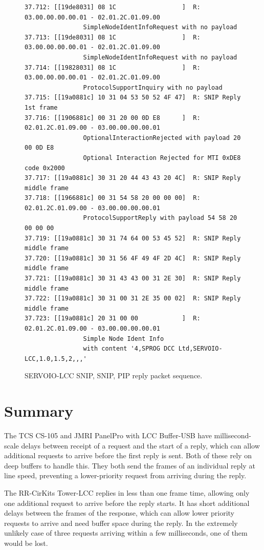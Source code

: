 \documentclass[11pt]{article}
\begin{document}
\cbstart
\begin{figure}[!htbp]
\begin{verbatim}
37.712: [[19de8031] 08 1C                  ]  R: 03.00.00.00.00.01 - 02.01.2C.01.09.00 
                SimpleNodeIdentInfoRequest with no payload
37.713: [[19de8031] 08 1C                  ]  R: 03.00.00.00.00.01 - 02.01.2C.01.09.00 
                SimpleNodeIdentInfoRequest with no payload
37.714: [[19828031] 08 1C                  ]  R: 03.00.00.00.00.01 - 02.01.2C.01.09.00 
                ProtocolSupportInquiry with no payload
37.715: [[19a0881c] 10 31 04 53 50 52 4F 47]  R: SNIP Reply 1st frame
37.716: [[1906881c] 00 31 20 00 0D E8      ]  R: 02.01.2C.01.09.00 - 03.00.00.00.00.01 
                OptionalInteractionRejected with payload 20 00 0D E8 
                Optional Interaction Rejected for MTI 0xDE8 code 0x2000
37.717: [[19a0881c] 30 31 20 44 43 43 20 4C]  R: SNIP Reply middle frame
37.718: [[1966881c] 00 31 54 58 20 00 00 00]  R: 02.01.2C.01.09.00 - 03.00.00.00.00.01 
                ProtocolSupportReply with payload 54 58 20 00 00 00
37.719: [[19a0881c] 30 31 74 64 00 53 45 52]  R: SNIP Reply middle frame
37.720: [[19a0881c] 30 31 56 4F 49 4F 2D 4C]  R: SNIP Reply middle frame
37.721: [[19a0881c] 30 31 43 43 00 31 2E 30]  R: SNIP Reply middle frame
37.722: [[19a0881c] 30 31 00 31 2E 35 00 02]  R: SNIP Reply middle frame
37.723: [[19a0881c] 20 31 00 00            ]  R: 02.01.2C.01.09.00 - 03.00.00.00.00.01 
                Simple Node Ident Info 
                with content '4,SPROG DCC Ltd,SERVOIO-LCC,1.0,1.5,2,,,'
\end{verbatim}
\caption{SERVOIO-LCC SNIP, SNIP, PIP reply packet sequence.}
\label{fig:SERVOIO_SNIP2PIP_reply_sequence}
\end{figure}
\cbend

\clearpage

\section{Summary}

The TCS CS-105 and JMRI PanelPro with LCC Buffer-USB have millisecond-scale delays between receipt
of a request and the start of a reply, which can allow additional requests to arrive
before the first reply is sent.  
Both of these rely on deep buffers to handle this.
They both send the frames of an individual reply
at line speed, preventing a lower-priority request from arriving during the reply.

The RR-CirKits Tower-LCC replies in less than one frame time, allowing only one additional
request to arrive before the reply starts.  It has short additional delays
between the frames of the response, which can allow lower priority
requests to arrive and need buffer space during the reply.  
In the extremely unlikely case of three requests arriving within a few milliseconds, one
of them would be lost.
\end{document}
